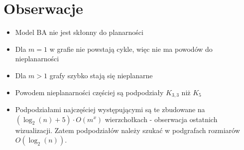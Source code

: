 \documentclass{article}
\begin{document}
\section{Obserwacje}
\begin{itemize}
  \item Model BA nie jest skłonny do planarności
  \item Dla $m=1$ w grafie nie powstają cykle, więc nie ma powodów do nieplanarności
  \item Dla $m>1$ grafy szybko stają się nieplanarne
  \item Powodem nieplanarności częściej są podpodziały $K_{3,3}$ niż $K_5$
  \item Podpodziałami najczęściej występującymi są te zbudowane na $(\log_2(n) + 5) \cdot O(m^x)$ wierzchołkach - obserwacja ostatnich wizualizacji. Zatem podpodziałów należy szukać w podgrafach rozmiarów $O(\log_2(n))$.
\end{itemize}
\end{document}
